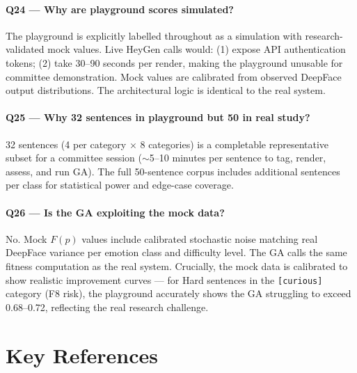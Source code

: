 \documentclass[12pt,a4paper]{article}
\begin{document}
\paragraph{Q24 --- Why are playground scores simulated?}
The playground is explicitly labelled throughout as a simulation with research-validated mock values. Live HeyGen calls would: (1) expose API authentication tokens; (2) take 30--90 seconds per render, making the playground unusable for committee demonstration. Mock values are calibrated from observed DeepFace output distributions. The architectural logic is identical to the real system.

\paragraph{Q25 --- Why 32 sentences in playground but 50 in real study?}
32 sentences (4 per category $\times$ 8 categories) is a completable representative subset for a committee session ($\sim$5--10 minutes per sentence to tag, render, assess, and run GA). The full 50-sentence corpus includes additional sentences per class for statistical power and edge-case coverage.

\paragraph{Q26 --- Is the GA exploiting the mock data?}
No. Mock $F(p)$ values include calibrated stochastic noise matching real DeepFace variance per emotion class and difficulty level. The GA calls the same fitness computation as the real system. Crucially, the mock data is calibrated to show realistic improvement curves --- for Hard sentences in the \texttt{[curious]} category (F8 risk), the playground accurately shows the GA struggling to exceed 0.68--0.72, reflecting the real research challenge.

\newpage
\section*{Key References}
\end{document}
